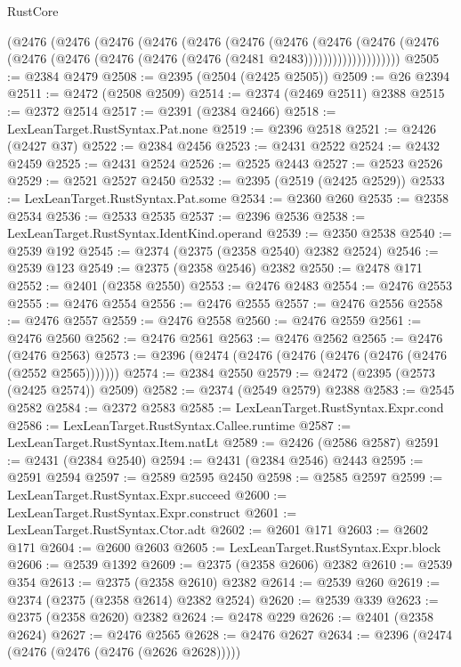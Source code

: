 \begin{lexlean}{RustCore}
\begin{coremodule}
            (@2476
              (@2476
                (@2476
                  (@2476
                    (@2476
                      (@2476
                        (@2476
                          (@2476
                            (@2476
                              (@2476
                                (@2476 (@2476 (@2476 (@2476 (@2476 (@2481 @2483))))))))))))))))))))
@2505 := @2384 @2479
@2508 := @2395 (@2504 (@2425 @2505))
@2509 := @26 @2394
@2511 := @2472 (@2508 @2509)
@2514 := @2374 (@2469 @2511) @2388
@2515 := @2372 @2514
@2517 := @2391 (@2384 @2466)
@2518 := LexLeanTarget.RustSyntax.Pat.none
@2519 := @2396 @2518
@2521 := @2426 (@2427 @37)
@2522 := @2384 @2456
@2523 := @2431 @2522
@2524 := @2432 @2459
@2525 := @2431 @2524
@2526 := @2525 @2443
@2527 := @2523 @2526
@2529 := @2521 @2527 @2450
@2532 := @2395 (@2519 (@2425 @2529))
@2533 := LexLeanTarget.RustSyntax.Pat.some
@2534 := @2360 @260
@2535 := @2358 @2534
@2536 := @2533 @2535
@2537 := @2396 @2536
@2538 := LexLeanTarget.RustSyntax.IdentKind.operand
@2539 := @2350 @2538
@2540 := @2539 @192
@2545 := @2374 (@2375 (@2358 @2540) @2382 @2524)
@2546 := @2539 @123
@2549 := @2375 (@2358 @2546) @2382
@2550 := @2478 @171
@2552 := @2401 (@2358 @2550)
@2553 := @2476 @2483
@2554 := @2476 @2553
@2555 := @2476 @2554
@2556 := @2476 @2555
@2557 := @2476 @2556
@2558 := @2476 @2557
@2559 := @2476 @2558
@2560 := @2476 @2559
@2561 := @2476 @2560
@2562 := @2476 @2561
@2563 := @2476 @2562
@2565 := @2476 (@2476 @2563)
@2573 := @2396 (@2474 (@2476 (@2476 (@2476 (@2476 (@2476 (@2552 @2565)))))))
@2574 := @2384 @2550
@2579 := @2472 (@2395 (@2573 (@2425 @2574)) @2509)
@2582 := @2374 (@2549 @2579) @2388
@2583 := @2545 @2582
@2584 := @2372 @2583
@2585 := LexLeanTarget.RustSyntax.Expr.cond
@2586 := LexLeanTarget.RustSyntax.Callee.runtime
@2587 := LexLeanTarget.RustSyntax.Item.natLt
@2589 := @2426 (@2586 @2587)
@2591 := @2431 (@2384 @2540)
@2594 := @2431 (@2384 @2546) @2443
@2595 := @2591 @2594
@2597 := @2589 @2595 @2450
@2598 := @2585 @2597
@2599 := LexLeanTarget.RustSyntax.Expr.succeed
@2600 := LexLeanTarget.RustSyntax.Expr.construct
@2601 := LexLeanTarget.RustSyntax.Ctor.adt
@2602 := @2601 @171
@2603 := @2602 @171
@2604 := @2600 @2603
@2605 := LexLeanTarget.RustSyntax.Expr.block
@2606 := @2539 @1392
@2609 := @2375 (@2358 @2606) @2382
@2610 := @2539 @354
@2613 := @2375 (@2358 @2610) @2382
@2614 := @2539 @260
@2619 := @2374 (@2375 (@2358 @2614) @2382 @2524)
@2620 := @2539 @339
@2623 := @2375 (@2358 @2620) @2382
@2624 := @2478 @229
@2626 := @2401 (@2358 @2624)
@2627 := @2476 @2565
@2628 := @2476 @2627
@2634 := @2396 (@2474 (@2476 (@2476 (@2476 (@2626 @2628)))))

\end{coremodule}
\end{lexlean}
